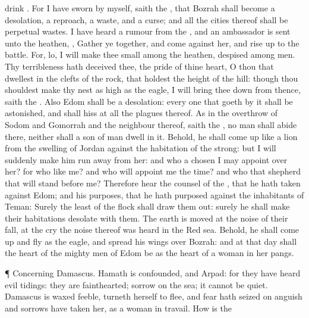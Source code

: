 {drink
{}.
For I have
sworn by myself,
saith the
{}, that
Bozrah shall become a
desolation, a
reproach, a
waste, and a
curse; and all the
cities thereof shall be
perpetual
wastes.
I have
heard a
rumour from the
{}, and an
ambassador is
sent unto the
heathen,
{}, Gather ye
together, and
come against her, and rise
up to the
battle.
For, lo, I will
make thee
small among the
heathen,
{}
despised among
men.
Thy
terribleness hath
deceived thee,
{} the
pride of thine
heart, O thou that
dwellest in the
clefts of the
rock, that
holdest the
height of the
hill: though thou shouldest make thy
nest as
high as the
eagle, I will bring thee
down from thence,
saith the
{}.
Also
Edom shall be a
desolation: every one that
goeth by it shall be
astonished, and shall
hiss at all the
plagues thereof.
As in the
overthrow of
Sodom and
Gomorrah and the
neighbour
{} thereof,
saith the
{}, no
man shall
abide there, neither shall a
son of
man
dwell in it.
Behold, he shall come
up like a
lion from the
swelling of
Jordan against the
habitation of the
strong: but I will
suddenly make him run
away from her: and who
{} a
chosen
{} I may
appoint over her? for who
{} like me? and who will appoint me the
time? and who
{} that
shepherd that will
stand
before me?
Therefore
hear the
counsel of the
{}, that he hath
taken against
Edom; and his
purposes, that he hath
purposed against the
inhabitants of
Teman: Surely the
least of the
flock shall draw them
out: surely he shall make their
habitations
desolate with them.
The
earth is
moved at the
noise of their
fall, at the
cry the
noise thereof was
heard in the
Red
sea.
Behold, he shall come
up and
fly as the
eagle, and
spread his
wings over
Bozrah: and at that
day shall the
heart of the mighty
men of
Edom be as the
heart of a
woman in her
pangs.
\par }{\PP {}¶ Concerning
Damascus.
Hamath is
confounded, and
Arpad: for they have
heard
evil
tidings: they are
fainthearted;
{}
sorrow on the
sea; it
cannot be
quiet.
Damascus is waxed
feeble,
{}
turneth herself to
flee, and
fear hath
seized on
{}
anguish and
sorrows have
taken her, as a woman in
travail.
How is the
}
